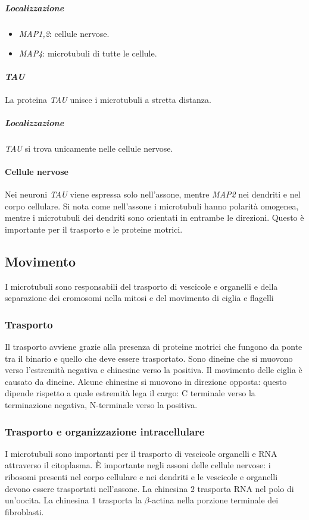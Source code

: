 				\subparagraph{Localizzazione}
				\begin{multicols}{2}
					\begin{itemize}
						\item \emph{MAP1,2}: cellule nervose.
						\item \emph{MAP4}: microtubuli di tutte le cellule.
					\end{itemize}
				\end{multicols}

			\paragraph{\emph{TAU}}
			La proteina \emph{TAU} unisce i microtubuli a stretta distanza.

				\subparagraph{Localizzazione}
				\emph{TAU} si trova unicamente nelle cellule nervose.


			\paragraph{Cellule nervose}
			Nei neuroni \emph{TAU} viene espressa solo nell'assone, mentre \emph{MAP2} nei dendriti e nel corpo cellulare.
			Si nota come nell'assone i microtubuli hanno polarit\`a omogenea, mentre i microtubuli dei dendriti sono orientati in entrambe le direzioni.
			Questo \`e importante per il trasporto e le proteine motrici.

	\subsection{Movimento}
	I microtubuli sono responsabili del trasporto di vescicole e organelli e della separazione dei cromosomi nella mitosi e del movimento di ciglia e flagelli

		\subsubsection{Trasporto}
		Il trasporto avviene grazie alla presenza di proteine motrici che fungono da ponte tra il binario e quello che deve essere trasportato.
		Sono dineine che si muovono verso l'estremit\`a negativa e chinesine verso la positiva.
		Il movimento delle ciglia \`e causato da dineine.
		Alcune chinesine si muovono in direzione opposta: questo dipende rispetto a quale estremit\`a lega il cargo: C terminale verso la terminazione negativa, N-terminale verso la positiva.

		\subsubsection{Trasporto e organizzazione intracellulare}
		I microtubuli sono importanti per il trasporto di vescicole organelli e RNA attraverso il citoplasma.
		\`E importante negli assoni delle cellule nervose: i ribosomi presenti nel corpo cellulare e nei dendriti e le vescicole e organelli devono essere trasportati nell'assone.
		La chinesina $2$ trasporta RNA nel polo di un'oocita.
		La chinesina $1$ trasporta la $\beta$-actina nella porzione terminale dei fibroblasti.


